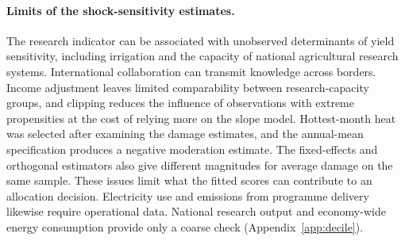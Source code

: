 \paragraph{Limits of the shock-sensitivity estimates.}
The research indicator can be associated with unobserved determinants of yield sensitivity,
including irrigation and the capacity of national agricultural research systems. International
collaboration can transmit knowledge across borders. Income adjustment leaves limited
comparability between research-capacity groups, and clipping reduces the influence of
observations with extreme propensities at the cost of relying more on the slope model.
Hottest-month heat was selected after examining the damage estimates, and the annual-mean
specification produces a negative moderation estimate. The fixed-effects and orthogonal
estimators also give different magnitudes for average damage on the same sample. These issues
limit what the fitted scores can contribute to an allocation decision. Electricity use and
emissions from programme delivery likewise require operational data. National research output and
economy-wide energy consumption provide only a coarse check (Appendix~\ref{app:decile}).
